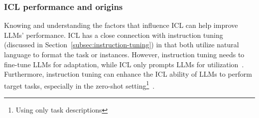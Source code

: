 \subsubsection{ICL performance and origins}
\label{subsec:icl-performance}

Knowing and understanding the factors that influence ICL can help improve LLMs' performance.
ICL has a close connection with instruction tuning (discussed in Section~\ref{subsec:instruction-tuning}) in that both utilize natural language to format the task or instances.
However, instruction tuning needs to fine-tune LLMs for adaptation, while ICL only prompts LLMs for utilization~\cite{survey}.
Furthermore, instruction tuning can enhance the ICL ability of LLMs to perform target tasks, especially in the zero-shot setting\footnote{Using only task descriptions}~\cite{chung2022scaling}.

